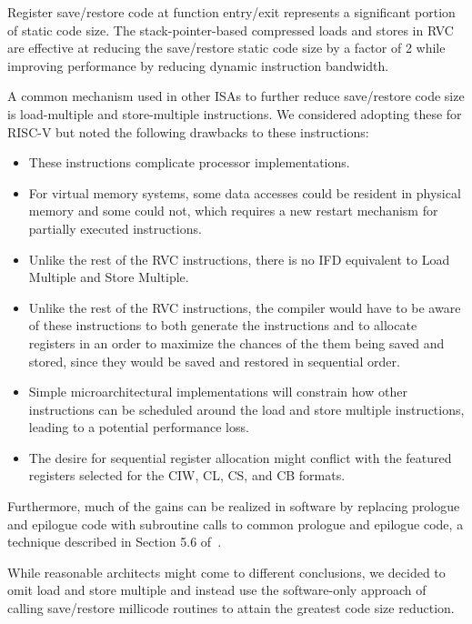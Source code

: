 \begin{commentary}
Register save/restore code at function entry/exit represents a
significant portion of static code size.  The stack-pointer-based
compressed loads and stores in RVC are effective at reducing the
save/restore static code size by a factor of 2 while improving
performance by reducing dynamic instruction bandwidth.

A common mechanism used in other ISAs to further reduce
save/restore code size is load-multiple and store-multiple
instructions.  We considered adopting these for RISC-V but noted the
following drawbacks to these instructions:
\begin{itemize}
\item These instructions complicate processor implementations.
\item For virtual memory systems, some data accesses could be
      resident in physical memory and some could not, which requires a
      new restart mechanism for partially executed instructions.
\item Unlike the rest of the RVC instructions, there is no IFD
      equivalent to Load Multiple and Store Multiple.
\item Unlike the rest of the RVC instructions, the compiler would
      have to be aware of these instructions to both generate the
      instructions and to allocate registers in an order to maximize
      the chances of the them being saved and stored, since they would
      be saved and restored in sequential order.
\item Simple microarchitectural implementations will constrain how
      other instructions can be scheduled around the load and store
      multiple instructions, leading to a potential performance loss.
\item The desire for sequential register allocation might conflict with
      the featured registers selected for the CIW, CL, CS, and CB formats.
\end{itemize}
Furthermore, much of the gains can be realized in software by replacing
prologue and epilogue code with subroutine calls to common
prologue and epilogue code, a technique described in
Section 5.6 of~\cite{waterman-phd}.

While reasonable architects might come to different conclusions, we
decided to omit load and store multiple and instead use the
software-only approach of calling save/restore millicode routines to
attain the greatest code size reduction.
\end{commentary}

